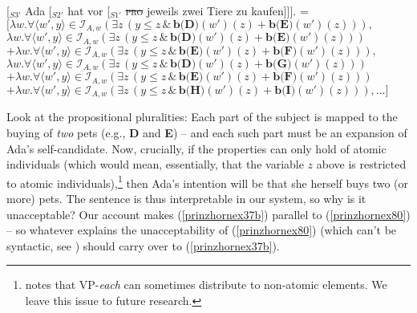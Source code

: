 \documentclass[output=paper,colorlinks,citecolor=brown,
]{langscibook}
\begin{document}
\ea
\ea  \label{prinzhornex63a} [$_{S3'}$ Ada [$_{S2'}$ hat vor [$_{S1'}$ \sout{\textsc{pro}} jeweils zwei Tiere zu kaufen]]].
\ex {} = $[\lambda w.  \forall \langle w' ,y \rangle \in \mathcal{I}_{A,w} (\exists  z \,(y \le z\, \& \,\textbf{b(D)}(w')(z)+\textbf{b(E)}(w')(z))),$\\$
\lambda w.  \forall \langle w' ,y \rangle \in \mathcal{I}_{A,w} (\exists  z \,(y \le z\, \& \,\textbf{b(D)}(w')(z)+\textbf{b(E)}(w')(z))) $\\$
+ \lambda w.  \forall \langle w' ,y \rangle \in \mathcal{I}_{A,w} (\exists  z \,(y \le z\, \& \,\textbf{b(E)}(w')(z)+\textbf{b(F)}(w')(z))), $\\$
\lambda w.  \forall \langle w' ,y \rangle \in \mathcal{I}_{A,w} (\exists z\,( y \le z\, \& \,\textbf{b(D)}(w')(z) + \textbf{b(G)}(w')(z)))$\\$ + \lambda w.  \forall \langle w' ,y \rangle \in \mathcal{I}_{A,w} (\exists z \, (y \le z\,\& \,\textbf{b(E)}(w')(z)+\textbf{b(F)}(w')(z))) $\\$ + \lambda w.  \forall \langle w' ,y \rangle \in \mathcal{I}_{A,w} (\exists z \,(y \le z\, \& \,\textbf{b(H)}(w')(z)+\textbf{b(I)}(w')(z))), \dots]$\label{prinzhornex63b}
\z\z

Look at the propositional pluralities: Each part of the subject is mapped  to the buying of \textit{two} pets (e.g., {\bf D} and {\bf E}) -- and each such part must be an expansion of Ada's self-candidate. Now, crucially, if the properties can only hold of atomic individuals (which would mean, essentially, that the variable $z$ above is restricted to atomic individuals),\footnote{\cite{Schwarzschild:1996} notes that VP-\textit{each} can sometimes distribute to non-atomic elements. We leave this issue to future research.} then Ada's intention will be that she herself buys two (or more) pets. The sentence is thus interpretable in our system, so why is it unacceptable? Our account makes (\ref{prinzhornex37b}) parallel to (\ref{prinzhornex80}) -- so whatever explains the unacceptability of (\ref{prinzhornex80}) (which can't be syntactic, see ) should carry over to (\ref{prinzhornex37b}).




\ea 
{}
	\z\z
\end{document}
